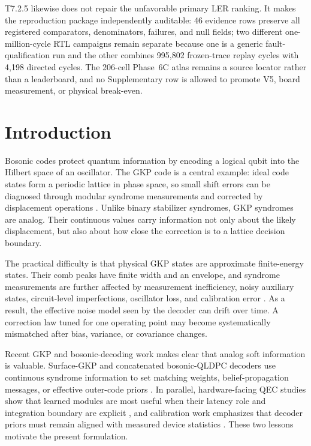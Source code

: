 \documentclass[11pt]{article}
\begin{document}
T7.2.5 likewise does not repair the unfavorable primary LER ranking.  It makes
the reproduction package independently auditable: 46 evidence rows preserve
all registered comparators, denominators, failures, and null fields; two
different one-million-cycle RTL campaigns remain separate because one is a
generic fault-qualification run and the other combines 995,802 frozen-trace
replay cycles with 4,198 directed cycles.  The 206-cell Phase~6C atlas remains
a source locator rather than a leaderboard, and no Supplementary row is allowed
to promote V5, board measurement, or physical break-even.

\section{Introduction}

Bosonic codes protect quantum information by encoding a logical qubit into the
Hilbert space of an oscillator.  The GKP code is a central example: ideal code
states form a periodic lattice in phase space, so small shift errors can be
diagnosed through modular syndrome measurements and corrected by displacement
operations \cite{gkp2001,grimsmo2021}.  Unlike binary stabilizer syndromes, GKP
syndromes are analog.  Their continuous values carry information not only
about the likely displacement, but also about how close the correction is to a
lattice decision boundary.

The practical difficulty is that physical GKP states are approximate
finite-energy states.  Their comb peaks have finite width and an envelope, and
syndrome measurements are further affected by measurement inefficiency, noisy
auxiliary states, circuit-level imperfections, oscillator loss, and calibration
error \cite{grimsmo2021,roy2025}.  As a result, the effective noise model seen
by the decoder can drift over time.  A correction law tuned for one operating
point may become systematically mismatched after bias, variance, or covariance
changes.

Recent GKP and bosonic-decoding work makes clear that analog soft information
is valuable.  Surface-GKP and concatenated bosonic-QLDPC decoders use
continuous syndrome information to set matching weights, belief-propagation
messages, or effective outer-code priors \cite{noh2020,noh2022,raveendran2022,
berent2024,borah2025}.  In parallel, hardware-facing QEC studies show that
learned modules are most useful when their latency role and integration
boundary are explicit \cite{chamberland2026,stein2026}, and calibration work
emphasizes that decoder priors must remain aligned with measured device
statistics \cite{spitz2018,wagner2021,dgr2023,chen2022,sivak2024}.  These two
lessons motivate the present formulation.
\end{document}
